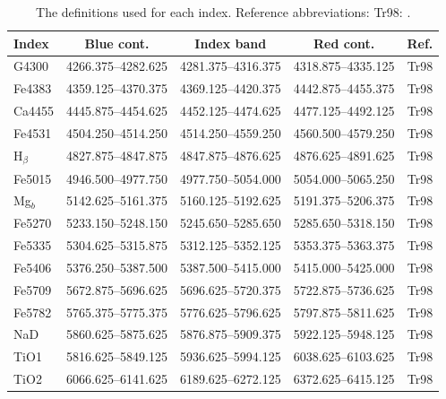 		\begin{table}
			\centering
			\caption{The definitions used for each index. Reference abbreviations: Tr98: \citet{Trager1998}.}
			\label{tab:abIndex}
			\begin{tabular}{l c c c c}
				\hline
				\hline
				Index 	& Blue cont. 		& Index band 		& Red cont. 	& Ref. \\
				\hline 
				G4300 	& 4266.375--4282.625 & 4281.375--4316.375 & 4318.875--4335.125 & Tr98 \\
				Fe4383 	& 4359.125--4370.375 & 4369.125--4420.375 & 4442.875--4455.375 & Tr98 \\
				Ca4455 	& 4445.875--4454.625 & 4452.125--4474.625 & 4477.125--4492.125 & Tr98 \\
				Fe4531 	& 4504.250--4514.250 & 4514.250--4559.250 & 4560.500--4579.250 & Tr98 \\
				H$_\beta$ & 4827.875--4847.875 & 4847.875--4876.625 & 4876.625--4891.625 & Tr98 \\
				Fe5015 	& 4946.500--4977.750 & 4977.750--5054.000 & 5054.000--5065.250 & Tr98 \\
				Mg$_b$ 	& 5142.625--5161.375 & 5160.125--5192.625 & 5191.375--5206.375 & Tr98 \\
				Fe5270 	& 5233.150--5248.150 & 5245.650--5285.650 & 5285.650--5318.150 & Tr98 \\
				Fe5335 	& 5304.625--5315.875 & 5312.125--5352.125 & 5353.375--5363.375 & Tr98 \\
				Fe5406 	& 5376.250--5387.500 & 5387.500--5415.000 & 5415.000--5425.000 & Tr98 \\
				Fe5709 	& 5672.875--5696.625 & 5696.625--5720.375 & 5722.875--5736.625 & Tr98 \\
				Fe5782 	& 5765.375--5775.375 & 5776.625--5796.625 & 5797.875--5811.625 & Tr98 \\
				NaD 	& 5860.625--5875.625 & 5876.875--5909.375 & 5922.125--5948.125 & Tr98 \\
				TiO1 	& 5816.625--5849.125 & 5936.625--5994.125 & 6038.625--6103.625 & Tr98 \\
				TiO2 	& 6066.625--6141.625 & 6189.625--6272.125 & 6372.625--6415.125 & Tr98 \\
				\hline
				\hline
			\end{tabular}
		\end{table}


